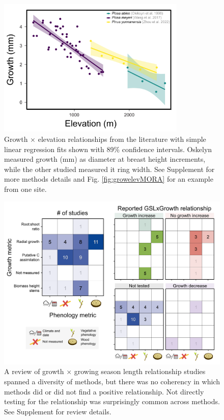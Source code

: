 \documentclass[11pt]{article}
\begin{document}
\begin{figure}[h!]
\includegraphics[width=0.8\textwidth]{..//figures/_allfiguresFromRuben/growthbyelevation.png}   %
\caption{Growth $\times$ elevation relationships from the literature with simple linear regression fits shown with 89\% confidence intervals. Oskelyn measured growth (mm) as diameter at breast height increments, while the other studied measured it ring width. See Supplement for more methods details and Fig. \ref{fig:growelevMORA} for an example from one site.}
\label{fig:gxelev}
\end{figure}

\clearpage
\begin{figure}[h!]
\includegraphics[width=1\textwidth]{..//figures/_allfiguresFromRuben/heatmap.png} %
\caption{A review of growth $\times$ growing season length relationship studies spanned a diversity of methods, but there was no coherency in which methods did or did not find a positive relationship. Not directly testing for the relationship was surprisingly common across methods. See Supplement for review details.}
\label{fig:heatmaps}
\end{figure}
\end{document}
